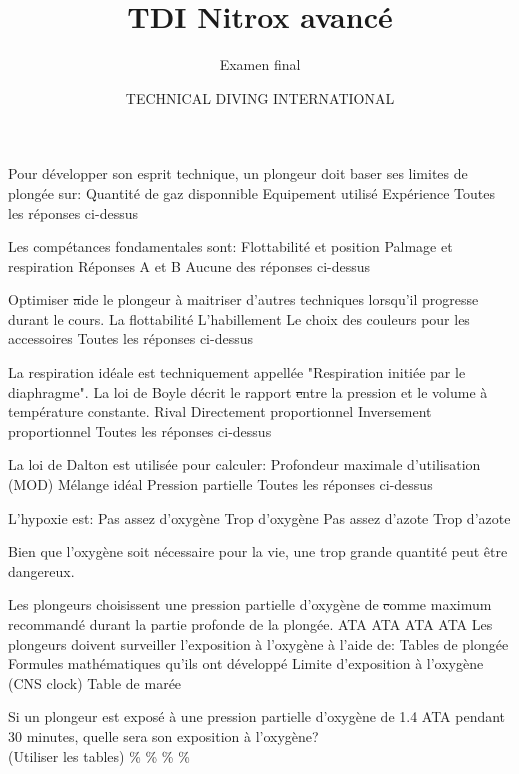 \documentclass[english,10pt,a4paper, twoside]{article}
\title{TDI Nitrox avancé}
\subtitle{Examen final}
\author{TECHNICAL DIVING INTERNATIONAL}
\begin{document}
\sloppy


	\begin{outline}
		\1 Pour développer son esprit technique, un plongeur doit baser ses limites de plongée sur:
			\2 Quantité de gaz disponnible
			\2 Equipement utilisé
			\2 Expérience
			\2 Toutes les réponses ci-dessus
	
		\1 Les compétances fondamentales sont:
			\2 Flottabilité et position
			\2 Palmage et respiration
			\2 Réponses A et B
			\2 Aucune des réponses ci-dessus
	
		\1 Optimiser \st aide le plongeur à maitriser d'autres techniques lorsqu'il progresse durant le cours.
			\2 La flottabilité
			\2 L'habillement
			\2 Le choix des couleurs pour les accessoires
			\2 Toutes les réponses ci-dessus
	
		\1 La respiration idéale est techniquement appellée "Respiration initiée par le diaphragme". \vf
		\1 La loi de Boyle décrit le rapport \st entre la pression et le volume à température constante.
			\2 Rival
			\2 Directement proportionnel
			\2 Inversement proportionnel
			\2 Toutes les réponses ci-dessus

		\1 La loi de Dalton est utilisée pour calculer:
			\2 Profondeur maximale d'utilisation (MOD)
			\2 Mélange idéal
			\2 Pression partielle
			\2 Toutes les réponses ci-dessus
		
		\1 L'hypoxie est:
			\2 Pas assez d'oxygène
			\2 Trop d'oxygène
			\2 Pas assez d'azote
			\2 Trop d'azote

		\1 Bien que l'oxygène soit nécessaire pour la vie, une trop grande quantité peut être dangereux. \vf

		\1 Les plongeurs choisissent une pression partielle d'oxygène de \st comme maximum recommandé durant la partie profonde de la plongée.
			 ATA
			 ATA
			 ATA
			 ATA
		\1 Les plongeurs doivent surveiller l'exposition à l'oxygène à l'aide de:
			\2 Tables de plongée
			\2 Formules mathématiques qu'ils ont développé
			\2 Limite d'exposition à l'oxygène (CNS clock)
			\2 Table de marée

		\1 Si un plongeur est exposé à une pression partielle d'oxygène de 1.4 ATA pendant 30 minutes, quelle sera son exposition à l'oxygène?\\ (Utiliser les tables)
			\%
			\%
			\%
			\%


\end{outline}
\end{document}
